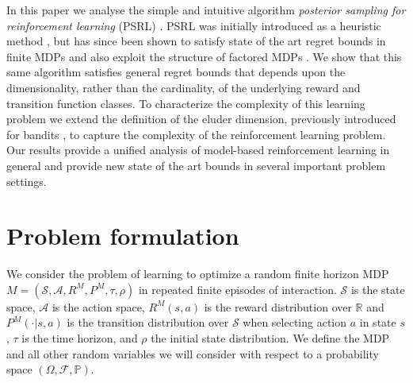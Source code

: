 \documentclass{article}
\newcommand{\Real}{\mathds{R}}
\newcommand{\Sc}{\mathcal{S}}
\newcommand{\Ac}{\mathcal{A}}
\begin{document}
In this paper we analyse the simple and intuitive algorithm \emph{posterior sampling for reinforcement learning} (PSRL) \cite{thompson1933,strens2000bayesian,osband2013more}.
PSRL was initially introduced as a heuristic method \cite{strens2000bayesian}, but has since been shown to satisfy state of the art regret bounds in finite MDPs \cite{osband2013more} and also exploit the structure of factored MDPs    \cite{osband2014near}.
We show that this same algorithm satisfies general regret bounds that depends upon the dimensionality, rather than the cardinality, of the underlying reward and transition function classes.
To characterize the complexity of this learning problem we extend the definition of the eluder dimension, previously introduced for bandits \cite{russo2013eluder}, to capture the complexity of the reinforcement learning problem.
Our results provide a unified analysis of model-based reinforcement learning in general and provide new state of the art bounds in several important problem settings.


\section{Problem formulation}

We consider the problem of learning to optimize a random finite horizon MDP $M = (\Sc, \Ac, R^M, P^M, \tau, \rho)$ in repeated finite episodes of interaction.
$\Sc$ is the state space, $\Ac$ is the action space, $R^M(s,a)$ is the reward distribution over $\Real$ and $P^M(\cdot|s,a)$ is the transition distribution over $\Sc$ when selecting action $a$ in state $s$, $\tau$ is the time horizon, and $\rho$ the initial state distribution.
We define the MDP and all other random variables we will consider with respect to a probability space $(\Omega, \mathscr{F}, \mathbb{P})$.
\end{document}
